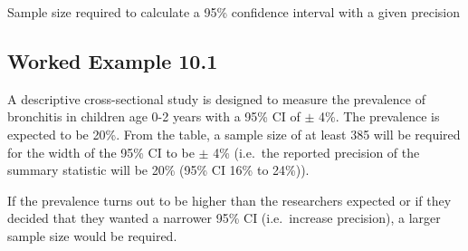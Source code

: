 \documentclass[
  a4paper,
]{memoir}
\begin{document}
\begin{table}[h]

\caption{\label{tbl-10-1}Sample size required to calculate a 95\%
confidence interval with a given precision}


\end{table}%

\subsection{Worked Example 10.1}\label{wex10-1}

A descriptive cross-sectional study is designed to measure the
prevalence of bronchitis in children age 0-2 years with a 95\% CI of
\(\pm\) 4\%. The prevalence is expected to be 20\%. From the table, a
sample size of at least 385 will be required for the width of the 95\%
CI to be \(\pm\) 4\% (i.e.~the reported precision of the summary
statistic will be 20\% (95\% CI 16\% to 24\%)).

If the prevalence turns out to be higher than the researchers expected
or if they decided that they wanted a narrower 95\% CI (i.e.~increase
precision), a larger sample size would be required.
\end{document}
